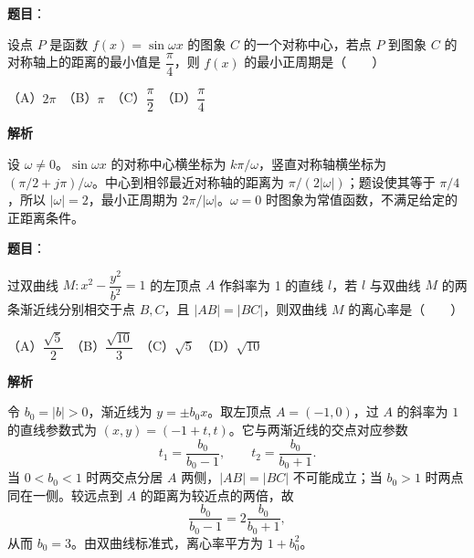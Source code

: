 \begin{answer}

\textbf{题目}：

设点 $P$ 是函数 $f(x)=\sin\omega x$ 的图象 $C$ 的一个对称中心，若点 $P$ 到图象 $C$ 的对称轴上的距离的最小值是 $\dfrac{\pi}{4}$，则 $f(x)$ 的最小正周期是\mbox{（　　）}

（A）$2\pi$　（B）$\pi$　（C）$\dfrac{\pi}{2}$　（D）$\dfrac{\pi}{4}$

\textbf{解析}

设 $\omega\ne0$。$\sin\omega x$ 的对称中心横坐标为 $k\pi/\omega$，竖直对称轴横坐标为 $(\pi/2+j\pi)/\omega$。中心到相邻最近对称轴的距离为 $\pi/(2|\omega|)$；题设使其等于 $\pi/4$，所以 $|\omega|=2$，最小正周期为 $2\pi/|\omega|$。$\omega=0$ 时图象为常值函数，不满足给定的正距离条件。


\end{answer}
\begin{answer}

\textbf{题目}：

过双曲线 $M:x^2-\dfrac{y^2}{b^2}=1$ 的左顶点 $A$ 作斜率为 1 的直线 $l$，若 $l$ 与双曲线 $M$ 的两条渐近线分别相交于点 $B,C$，且 $|AB|=|BC|$，则双曲线 $M$ 的离心率是\mbox{（　　）}

（A）$\dfrac{\sqrt5}{2}$　（B）$\dfrac{\sqrt{10}}{3}$　（C）$\sqrt5$　（D）$\sqrt{10}$

\textbf{解析}

令 $b_0=|b|>0$，渐近线为 $y=\pm b_0x$。取左顶点 $A=(-1,0)$，过 $A$ 的斜率为 $1$ 的直线参数式为 $(x,y)=(-1+t,t)$。它与两渐近线的交点对应参数
\nopagebreak[4]
\[
t_1=\frac{b_0}{b_0-1},\qquad t_2=\frac{b_0}{b_0+1}.
\]
当 $0<b_0<1$ 时两交点分居 $A$ 两侧，$|AB|=|BC|$ 不可能成立；当 $b_0>1$ 时两点同在一侧。较远点到 $A$ 的距离为较近点的两倍，故
\nopagebreak[4]
\[
\frac{b_0}{b_0-1}=2\frac{b_0}{b_0+1},
\]
从而 $b_0=3$。由双曲线标准式，离心率平方为 $1+b_0^2$。


\end{answer}
